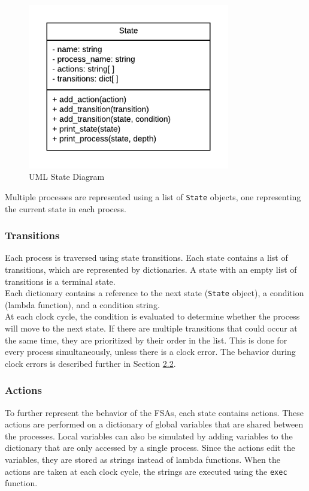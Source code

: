 \documentclass[12pt]{extarticle}
\begin{document}
\begin{figure}[!htbp]
  \begin{center}
  \includegraphics[width=250pt]{./state.png}
  \end{center}
  \vspace*{-10mm}
  \caption{UML State Diagram}
  \label{fig:state}
\end{figure}

Multiple processes are represented using a list of \verb|State| objects, one representing the current state in each process.

\subsubsection{Transitions}
Each process is traversed using state transitions. Each state contains a list of transitions, which are represented by dictionaries. A state with an empty list of transitions is a terminal state.\\

Each dictionary contains a reference to the next state (\verb|State| object), a condition (lambda function), and a condition string.\\

At each clock cycle, the condition is evaluated to determine whether the process will move to the next state. If there are multiple transitions that could occur at the same time, they are prioritized by their order in the list. This is done for every process simultaneously, unless there is a clock error. The behavior during clock errors is described further in Section \hyperref[sec:clkerr]{2.2}.

\subsubsection{Actions}
To further represent the behavior of the FSAs, each state contains actions. These actions are performed on a dictionary of global variables that are shared between the processes. Local variables can also be simulated by adding variables to the dictionary that are only accessed by a single process. Since the actions edit the variables, they are stored as strings instead of lambda functions. When the actions are taken at each clock cycle, the strings are executed using the \verb|exec| function.\\
\end{document}
